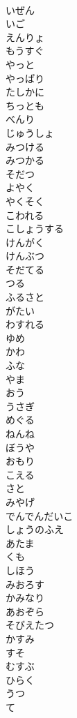 \documentclass[8pt]{extreport}
\begin{document}
\begin{CJK}{UTF8}{min}
\\	いぜん
\\	いご
\\	えんりょ
\\	もうすぐ
\\	やっと
\\	やっぱり
\\	たしかに
\\	ちっとも
\\	べんり
\\	じゅうしょ
\\	みつける
\\	みつかる
\\	そだつ
\\	よやく
\\	やくそく
\\	こわれる
\\	こしょうする
\\	けんがく
\\	けんぶつ
\\	そだてる
\\	つる
\\	ふるさと
\\	がたい
\\	わすれる
\\	ゆめ
\\	かわ
\\	ふな
\\	やま
\\	おう
\\	うさぎ
\\	めぐる
\\	ねんね
\\	ぼうや
\\	おもり
\\	こえる
\\	さと
\\	みやげ
\\	でんでんだいこ
\\	しょうのふえ
\\	あたま
\\	くも
\\	しほう
\\	みおろす
\\	かみなり
\\	あおぞら
\\	そびえたつ
\\	かすみ
\\	すそ
\\	むすぶ
\\	ひらく
\\	うつ
\\	て

\end{CJK}
\end{document}
